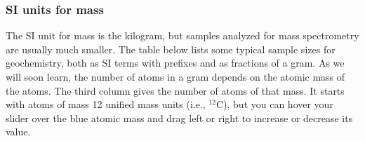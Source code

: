 \documentclass[
  letterpaper,
  DIV=11,
  numbers=noendperiod]{scrreprt}
\begin{document}
\subsubsection{SI units for mass}\label{si-units-for-mass}

The SI unit for mass is the kilogram, but samples analyzed for mass
spectrometry are usually much smaller. The table below lists some
typical sample sizes for geochemistry, both as SI terms with prefixes
and as fractions of a gram. As we will soon learn, the number of atoms
in a gram depends on the atomic mass of the atoms. The third column
gives the number of atoms of that mass. It starts with atoms of mass 12
unified mass units (i.e., \(^{12}\)C), but you can hover your slider
over the blue atomic mass and drag left or right to increase or decrease
its value.
\end{document}
